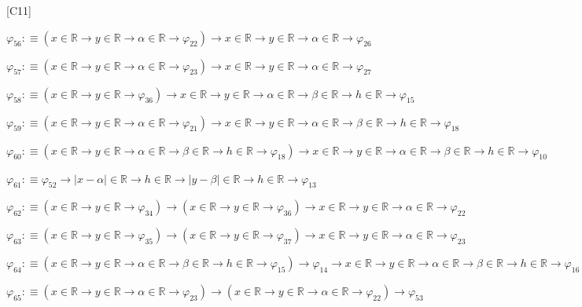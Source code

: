 \begin{fullproof}{[C11]}
\begin{abbrevlist}
\item $\varphi_{56} :\equiv (x \in \mathbb{R} \to y \in \mathbb{R} \to \alpha \in \mathbb{R} \to \varphi_{22}) \to x \in \mathbb{R} \to y \in \mathbb{R} \to \alpha \in \mathbb{R} \to \varphi_{26}$
\item $\varphi_{57} :\equiv (x \in \mathbb{R} \to y \in \mathbb{R} \to \alpha \in \mathbb{R} \to \varphi_{23}) \to x \in \mathbb{R} \to y \in \mathbb{R} \to \alpha \in \mathbb{R} \to \varphi_{27}$
\item $\varphi_{58} :\equiv (x \in \mathbb{R} \to y \in \mathbb{R} \to \varphi_{36}) \to x \in \mathbb{R} \to y \in \mathbb{R} \to \alpha \in \mathbb{R} \to \beta \in \mathbb{R} \to h \in \mathbb{R} \to \varphi_{15}$
\item $\varphi_{59} :\equiv (x \in \mathbb{R} \to y \in \mathbb{R} \to \alpha \in \mathbb{R} \to \varphi_{21}) \to x \in \mathbb{R} \to y \in \mathbb{R} \to \alpha \in \mathbb{R} \to \beta \in \mathbb{R} \to h \in \mathbb{R} \to \varphi_{18}$
\item $\varphi_{60} :\equiv (x \in \mathbb{R} \to y \in \mathbb{R} \to \alpha \in \mathbb{R} \to \beta \in \mathbb{R} \to h \in \mathbb{R} \to \varphi_{18}) \to x \in \mathbb{R} \to y \in \mathbb{R} \to \alpha \in \mathbb{R} \to \beta \in \mathbb{R} \to h \in \mathbb{R} \to \varphi_{10}$
\item $\varphi_{61} :\equiv \varphi_{52} \to \lvert x - \alpha \rvert \in \mathbb{R} \to h \in \mathbb{R} \to \lvert y - \beta \rvert \in \mathbb{R} \to h \in \mathbb{R} \to \varphi_{13}$
\item $\varphi_{62} :\equiv (x \in \mathbb{R} \to y \in \mathbb{R} \to \varphi_{34}) \to (x \in \mathbb{R} \to y \in \mathbb{R} \to \varphi_{36}) \to x \in \mathbb{R} \to y \in \mathbb{R} \to \alpha \in \mathbb{R} \to \varphi_{22}$
\item $\varphi_{63} :\equiv (x \in \mathbb{R} \to y \in \mathbb{R} \to \varphi_{35}) \to (x \in \mathbb{R} \to y \in \mathbb{R} \to \varphi_{37}) \to x \in \mathbb{R} \to y \in \mathbb{R} \to \alpha \in \mathbb{R} \to \varphi_{23}$
\item $\varphi_{64} :\equiv (x \in \mathbb{R} \to y \in \mathbb{R} \to \alpha \in \mathbb{R} \to \beta \in \mathbb{R} \to h \in \mathbb{R} \to \varphi_{15}) \to \varphi_{14} \to x \in \mathbb{R} \to y \in \mathbb{R} \to \alpha \in \mathbb{R} \to \beta \in \mathbb{R} \to h \in \mathbb{R} \to \varphi_{16}$
\item $\varphi_{65} :\equiv (x \in \mathbb{R} \to y \in \mathbb{R} \to \alpha \in \mathbb{R} \to \varphi_{23}) \to (x \in \mathbb{R} \to y \in \mathbb{R} \to \alpha \in \mathbb{R} \to \varphi_{22}) \to \varphi_{53}$

\end{abbrevlist}
\end{fullproof}
